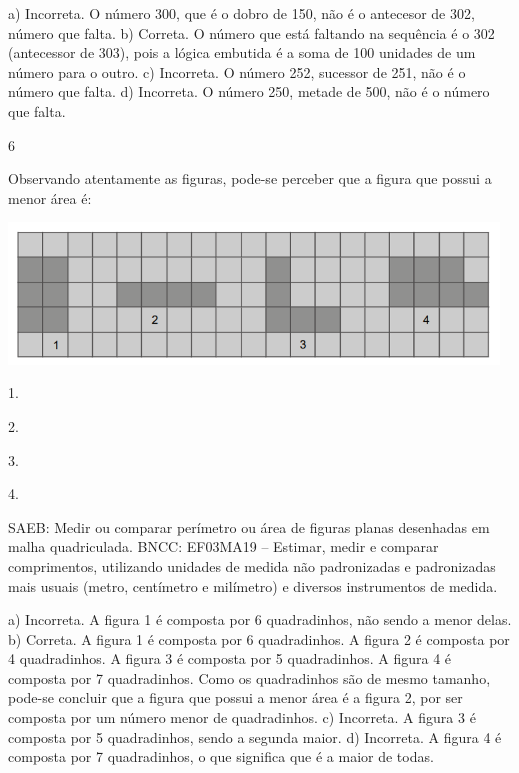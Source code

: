 {\begin{escolha}
{a) Incorreta. O número 300, que é o dobro de 150, não é o antecesor de 302, número que falta.
b) Correta. O número que está faltando na sequência é o 302 (antecessor de 303), pois a lógica embutida é a soma de 100 unidades de um número para o outro.
c) Incorreta. O número 252, sucessor de 251, não é o número que falta.
d) Incorreta. O número 250, metade de 500, não é o número que falta.

\num{6}

Observando atentamente as figuras, pode-se perceber que a figura que possui a menor área é:


\includegraphics[width=5.12179in,height=1.48342in]{media/image133.png}

\begin{escolha}

\item
  1.
\item
  2.
\item
  3.
\item
  4.
\end{escolha}

SAEB: Medir ou comparar perímetro ou área de figuras planas desenhadas em malha quadriculada.
BNCC: EF03MA19 -- Estimar, medir e comparar comprimentos, utilizando unidades de medida
não padronizadas e padronizadas mais usuais (metro, centímetro e milímetro) e diversos
instrumentos de medida.

a) Incorreta. A figura 1 é composta por 6 quadradinhos, não sendo a menor delas.
b) Correta. A figura 1 é composta por 6 quadradinhos. A figura 2 é composta por 4 quadradinhos. A figura 3 é composta por 5 quadradinhos. A figura 4 é composta por 7 quadradinhos. Como os quadradinhos são de mesmo tamanho, pode-se concluir que a figura que possui a menor área é a figura 2, por ser composta por um número menor de quadradinhos.
c) Incorreta. A figura 3 é composta por 5 quadradinhos, sendo a segunda maior.
d) Incorreta. A figura 4 é composta por 7 quadradinhos, o que significa que é a maior de todas.

}
\end{escolha}}
